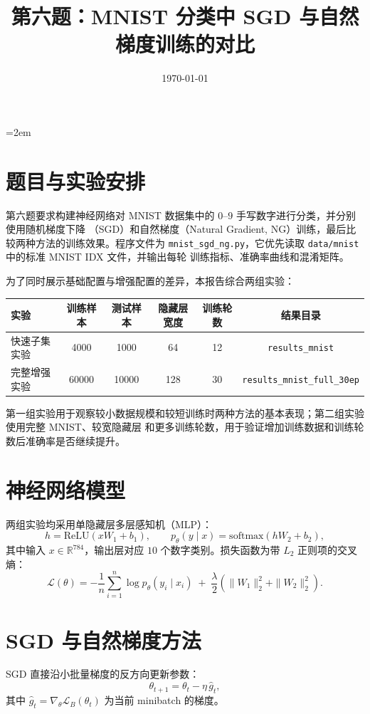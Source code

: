 \documentclass[UTF8]{ctexart}
\title{第六题：MNIST 分类中 SGD 与自然梯度训练的对比}
\author{}
\date{\today}
\begin{document}
\emergencystretch=2em
\maketitle

\section{题目与实验安排}

第六题要求构建神经网络对 MNIST 数据集中的 $0$--$9$ 手写数字进行分类，并分别使用随机梯度下降
（SGD）和自然梯度（Natural Gradient, NG）训练，最后比较两种方法的训练效果。程序文件为
\texttt{mnist\_sgd\_ng.py}，它优先读取 \texttt{data/mnist} 中的标准 MNIST IDX 文件，并输出每轮
训练指标、准确率曲线和混淆矩阵。

为了同时展示基础配置与增强配置的差异，本报告综合两组实验：
\begin{center}
\begin{tabular}{lccccc}
\toprule
实验 & 训练样本 & 测试样本 & 隐藏层宽度 & 训练轮数 & 结果目录 \\
\midrule
快速子集实验 & 4000 & 1000 & 64 & 12 & \texttt{results\_mnist} \\
完整增强实验 & 60000 & 10000 & 128 & 30 & \texttt{results\_mnist\_full\_30ep} \\
\bottomrule
\end{tabular}
\end{center}

第一组实验用于观察较小数据规模和较短训练时两种方法的基本表现；第二组实验使用完整 MNIST、较宽隐藏层
和更多训练轮数，用于验证增加训练数据和训练轮数后准确率是否继续提升。

\section{神经网络模型}

两组实验均采用单隐藏层多层感知机（MLP）：
\[
h=\mathrm{ReLU}(xW_1+b_1),\qquad
p_\theta(y\mid x)=\mathrm{softmax}(hW_2+b_2),
\]
其中输入 $x\in\mathbb{R}^{784}$，输出层对应 $10$ 个数字类别。损失函数为带 $L_2$ 正则项的交叉熵：
\[
\mathcal{L}(\theta)=
-\frac{1}{n}\sum_{i=1}^{n}\log p_\theta(y_i\mid x_i)
\;+\;\frac{\lambda}{2}\left(\|W_1\|_2^2+\|W_2\|_2^2\right).
\]

\section{SGD 与自然梯度方法}

SGD 直接沿小批量梯度的反方向更新参数：
\[
\theta_{t+1}=\theta_t-\eta\,\hat g_t,
\]
其中 $\hat g_t=\nabla_\theta \mathcal{L}_B(\theta_t)$ 为当前 minibatch 的梯度。
\end{document}
